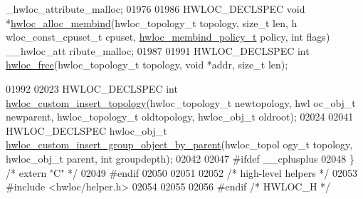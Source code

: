 \begin{DoxyCode}
      \_hwloc\_attribute\_malloc;
01976 
01986 HWLOC\_DECLSPEC \textcolor{keywordtype}{void} *\hyperlink{a00050_ga221a7edc5d436300374fa16463f607e5}{hwloc_alloc_membind}(hwloc\_topology\_t topology, \textcolor{keywordtype}{size\_t} len, h
      wloc\_const\_cpuset\_t cpuset, \hyperlink{a00050_gac9764f79505775d06407b40f5e4661e8}{hwloc_membind_policy_t} policy, \textcolor{keywordtype}{int} flags) \_\_hwloc\_att
      ribute\_malloc;
01987 
01991 HWLOC\_DECLSPEC \textcolor{keywordtype}{int} \hyperlink{a00050_ga986d9b4cc76da592c4b937c6cb7d9d56}{hwloc_free}(hwloc\_topology\_t topology, \textcolor{keywordtype}{void} *addr, \textcolor{keywordtype}{size\_t} len);
      
01992 
02023 HWLOC\_DECLSPEC \textcolor{keywordtype}{int} \hyperlink{a00051_ga59ccf6a63cb23d63940e8b782059d9cb}{hwloc_custom_insert_topology}(hwloc\_topology\_t newtopology, hwl
      oc\_obj\_t newparent, hwloc\_topology\_t oldtopology, hwloc\_obj\_t oldroot);
02024 
02041 HWLOC\_DECLSPEC hwloc\_obj\_t \hyperlink{a00051_gac1037fe389bfa7c2bf0e3739b7e20844}{hwloc_custom_insert_group_object_by_parent}(hwloc\_topol
      ogy\_t topology, hwloc\_obj\_t parent, \textcolor{keywordtype}{int} groupdepth);
02042 
02047 \textcolor{preprocessor}{#ifdef \_\_cplusplus}
02048 \textcolor{preprocessor}{}\} \textcolor{comment}{/* extern "C" */}
02049 \textcolor{preprocessor}{#endif}
02050 \textcolor{preprocessor}{}
02051 
02052 \textcolor{comment}{/* high-level helpers */}
02053 \textcolor{preprocessor}{#include <hwloc/helper.h>}
02054 
02055 
02056 \textcolor{preprocessor}{#endif }\textcolor{comment}{/* HWLOC\_H */}
\end{DoxyCode}
